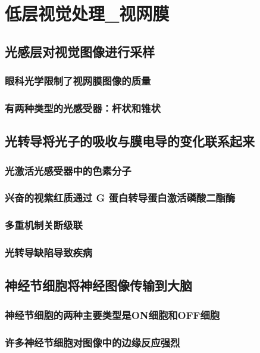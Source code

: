 \chapter{低层视觉处理\_视网膜}

\section{光感层对视觉图像进行采样}
\subsection{眼科光学限制了视网膜图像的质量}
\subsection{有两种类型的光感受器：杆状和锥状}

\section{光转导将光子的吸收与膜电导的变化联系起来}
\subsection{光激活光感受器中的色素分子}
\subsection{兴奋的视紫红质通过 G 蛋白转导蛋白激活磷酸二酯酶}
\subsection{多重机制关断级联}
\subsection{光转导缺陷导致疾病}

\section{神经节细胞将神经图像传输到大脑}
\subsection{神经节细胞的两种主要类型是ON细胞和OFF细胞}
\subsection{许多神经节细胞对图像中的边缘反应强烈}
